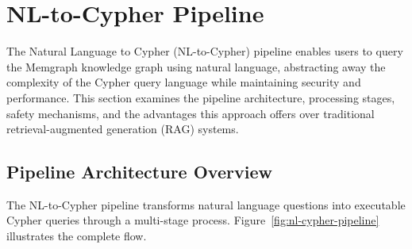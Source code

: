 
\section{NL-to-Cypher Pipeline}
\label{sec:nl-cypher}

The Natural Language to Cypher (NL-to-Cypher) pipeline enables users to query the Memgraph knowledge graph using natural language, abstracting away the complexity of the Cypher query language while maintaining security and performance. This section examines the pipeline architecture, processing stages, safety mechanisms, and the advantages this approach offers over traditional retrieval-augmented generation (RAG) systems.

\subsection{Pipeline Architecture Overview}

The NL-to-Cypher pipeline transforms natural language questions into executable Cypher queries through a multi-stage process. Figure~\ref{fig:nl-cypher-pipeline} illustrates the complete flow.

